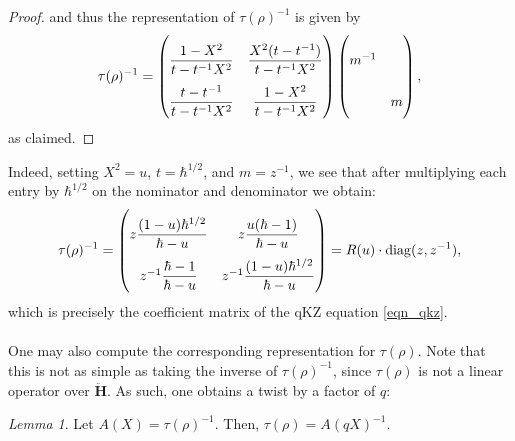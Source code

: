 \documentclass[a4paper]{report}
\theoremstyle{theorem}
\theoremstyle{definition}
\theoremstyle{remark}
\theoremstyle{proposition}
\theoremstyle{conjecture}
\theoremstyle{lemma}
\newtheorem{lemma}{Lemma}
\theoremstyle{corollary}
\theoremstyle{exercise}
\theoremstyle{example}
\newcommand{\on}{\operatorname}
\begin{document}
\begin{proof}
      and thus the representation of $\tau(\rho)^{-1}$ is given by 
      \begin{equation}\label{eqn_taurho_matrix}
          \tau(\rho)^{-1} = \renewcommand\arraystretch{2.5}\begin{pmatrix}
              \displaystyle\frac{1-X^2}{t-t^{-1}X^2} & \displaystyle\frac{X^2(t-t^{-1})}{t-t^{-1}X^2}\\
              \displaystyle\frac{t-t^{-1}}{t-t^{-1}X^2} & \displaystyle\frac{1-X^2}{t-t^{-1}X^2}
              \end{pmatrix} \begin{pmatrix}
              m^{-1}\\
                       &m
          \end{pmatrix},
      \end{equation}
      as claimed.
  \end{proof}
  Indeed, setting $X^2 = u$, $t = \hbar^{1/2}$, and $m = z^{-1}$, we 
  see that after multiplying each entry by $\hbar^{1/2}$ on the nominator 
  and denominator we obtain: $$\tau(\rho)^{-1} = \renewcommand\arraystretch{2.5}\begin{pmatrix}
      z\displaystyle\frac{(1-u)\hbar^{1/2}}{\hbar - u} & z\displaystyle\frac{u(\hbar-1)}{\hbar - u}\\
      z^{-1} \displaystyle\frac{\hbar - 1}{\hbar - u} & z^{-1} \displaystyle\frac{(1-u)\hbar^{1/2}}{\hbar - u}
  \end{pmatrix} = R(u) \cdot \on{diag}(z,z^{-1}),$$
  which is precisely the coefficient matrix of the qKZ equation \eqref{eqn_qkz}.\\\\
  One may also compute the corresponding representation for $\tau(\rho)$. Note that this is not as simple 
  as taking the inverse of $\tau(\rho)^{-1}$, since $\tau(\rho)$ is not a linear operator over $\mathbf{\ddot{\mathbf{H}}}$.
  As such, one obtains a twist by a factor of $q$:
  
  \begin{lemma}\label{lem_taurho2}
      Let $A(X) = \tau(\rho)^{-1}$.
      Then, $\tau(\rho) = A(qX)^{-1}$.
  \end{lemma}
  
\end{document}
